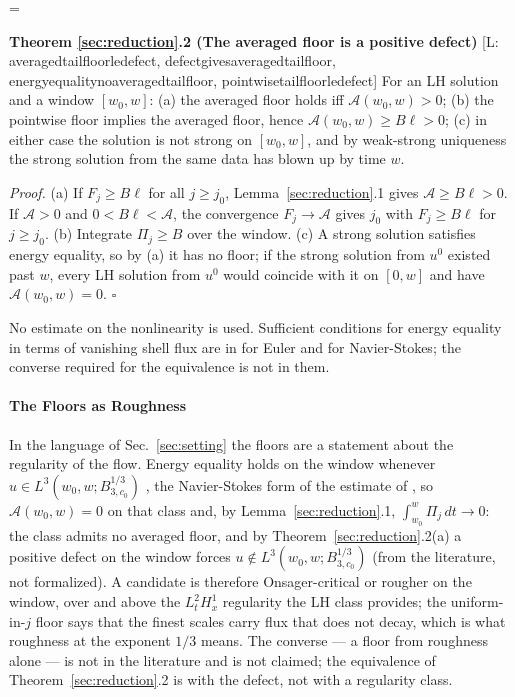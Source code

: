 \documentclass[letterpaper,twocolumn]{article}
\newcommand{\lean}[1]{{\footnotesize\def\_{\textunderscore\allowbreak}%
\hspace{0pt}[L: {\ttfamily\fontdimen3\font=2pt\fontdimen4\font=1pt #1}]}}
\newcommand{\A}{\mathcal{A}}
\begin{document}
\begin{list}{}{\leftmargin=\parindent\rightmargin=0pt}
\item
\textbf{Theorem \ref{sec:reduction}.2 (The averaged floor is a positive defect)}
\lean{averaged\_tail\_floor\_le\_defect,
defect\_gives\_averaged\_tail\_floor,
energy\_equality\_no\_averaged\_tail\_floor,
pointwise\_tail\_floor\_le\_defect}
For an LH solution and a window $[w_0, w]$:
(a) the averaged floor holds iff $\A(w_0, w) > 0$;
(b) the pointwise floor implies the averaged floor, hence $\A(w_0, w)
\geq B\ell > 0$;
(c) in either case the solution is not strong on $[w_0, w]$, and by
weak-strong uniqueness \cite{Pro59,Ser62} the strong solution from the same
data has blown up by time $w$.
\end{list}
{\it Proof.} (a) If $F_j \geq B\ell$ for all $j \geq j_0$,
Lemma~\ref{sec:reduction}.1 gives $\A \geq B\ell > 0$. If $\A > 0$ and $0
< B\ell < \A$, the convergence $F_j \to \A$ gives $j_0$ with $F_j \geq
B\ell$ for $j \geq j_0$. (b) Integrate $\Pi_j \geq B$ over the window.
(c) A strong solution satisfies energy equality, so by (a) it has no
floor; if the strong solution from $u^0$ existed past $w$, every LH
solution from $u^0$ would coincide with it on $[0,w]$ and have $\A(w_0,w)
= 0$. \hspace*{\fill}$\square$

No estimate on the nonlinearity is used. Sufficient conditions for energy
equality in terms of vanishing shell flux are in \cite{CheConFriShv08}
for Euler and \cite{CheFriShv10,Shv10} for Navier-Stokes; the converse
required for the equivalence is not in them.

\paragraph*{The Floors as Roughness}

In the language of Sec.~\ref{sec:setting} the floors are a statement
about the regularity of the flow. Energy equality holds on the window
whenever $u \in L^3(w_0,w; B^{1/3}_{3,c_0})$ \cite{CheFriShv10,Shv10},
the Navier-Stokes form of the estimate of \cite{CheConFriShv08}, so
$\A(w_0,w) = 0$ on that class and, by Lemma~\ref{sec:reduction}.1,
$\int_{w_0}^{w}\Pi_j\,dt \to 0$: the class admits no averaged floor, and
by Theorem~\ref{sec:reduction}.2(a) a positive defect on the window
forces $u \notin L^3(w_0,w; B^{1/3}_{3,c_0})$ (from the literature, not
formalized). A candidate is therefore Onsager-critical or rougher on the
window, over and above the $L^2_t H^1_x$ regularity the LH class
provides; the uniform-in-$j$ floor says that the finest scales carry
flux that does not decay, which is what roughness at the exponent $1/3$
means. The converse --- a floor from roughness alone --- is not in the
literature and is not claimed; the equivalence of
Theorem~\ref{sec:reduction}.2 is with the defect, not with a regularity
class.
\end{document}
